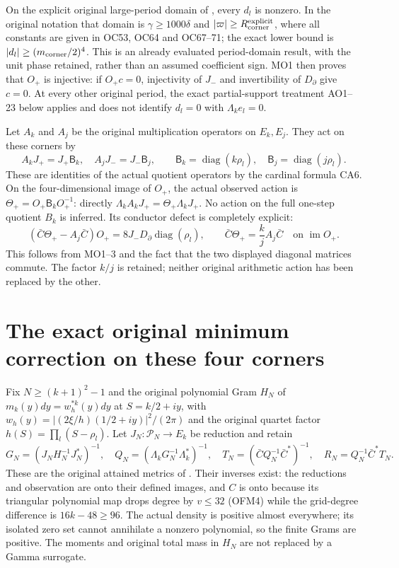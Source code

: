 \documentclass[11pt]{article}
\newcommand{\diag}{\operatorname{diag}}
\begin{document}
On the explicit original large-period domain of
\cite[OC50--74]{CornerNonzero}, every $d_l$ is nonzero. In the
original notation that domain is $\gamma\ge1000\delta$ and
$|\varpi|\ge R_{\rm corner}^{\rm explicit}$, where all constants
are given in OC53, OC64 and OC67--71; the exact lower bound is
$|d_l|\ge(m_{\rm corner}/2)^4$. This is an already evaluated
period-domain result, with the unit phase retained, rather than
an assumed coefficient sign. MO1 then proves that $O_+$ is
injective: if $O_+c=0$, injectivity of $J_-$ and invertibility
of $D_\partial$ give $c=0$. At every other original period,
the exact partial-support treatment AO1--23 below applies and
does not identify $d_l=0$ with $\Lambda_ke_l=0$.

Let $A_k$ and $A_j$ be the original multiplication operators
on $E_k,E_j$. They act on these corners by
\[
 A_kJ_+=J_+ \mathsf B_k,\quad A_jJ_-=J_-\mathsf B_j,\qquad
 \mathsf B_k=\diag(k\rho_l),\quad \mathsf B_j=\diag(j\rho_l).
 \tag{MO3}
\]
These are identities of the actual quotient operators by the
cardinal formula CA6. On the four-dimensional image of $O_+$,
the actual observed action is
$\Theta_+=O_+\mathsf B_kO_+^{-1}$: directly
$\Lambda_kA_kJ_+=\Theta_+\Lambda_kJ_+$.
No action on the full one-step quotient $B_k$ is inferred.
Its conductor defect is completely explicit:
\[
 (\bar C\Theta_+-A_j\bar C)O_+
       =8J_-D_\partial\diag(\rho_l),\qquad
 \bar C\Theta_+=\frac{k}{j}A_j\bar C
                 \quad\text{on }\operatorname{im}O_+.
 \tag{MO4}
\]
This follows from MO1--3 and the fact that the two displayed
diagonal matrices commute. The factor $k/j$ is retained;
neither original arithmetic action has been replaced by the other.

\section{The exact original minimum correction on these four corners}
Fix $N\ge(k+1)^2-1$ and the original polynomial Gram $H_N$
of $m_k(y)dy=w_h^{*k}(y)dy$ at $S=k/2+iy$, with
$w_h(y)=|(2\xi/h)(1/2+iy)|^2/(2\pi)$ and the original
quartet factor $h(S)=\prod_l(S-\rho_l)$.
Let $J_N:\mathcal P_N\to E_k$ be reduction and retain
\[
 G_N=(J_NH_N^{-1}J_N^*)^{-1},\quad
 Q_N=(\Lambda_kG_N^{-1}\Lambda_k^*)^{-1},\quad
 T_N=(\bar C Q_N^{-1}\bar C^*)^{-1},\quad
 R_N=Q_N^{-1}\bar C^*T_N. \tag{MO5}
\]
These are the original attained metrics of \cite[EQ1--5]{EightMinimum}.
Their inverses exist: the reductions and observation are onto their
defined images, and $C$ is onto because its triangular polynomial
map drops degree by $v\le32$ (OFM4) while the grid-degree difference is
$16k-48\ge96$. The actual density is positive almost everywhere;
its isolated zero set cannot annihilate a nonzero polynomial, so
the finite Grams are positive. The moments and original total mass
in $H_N$ are not replaced by a Gamma surrogate.
\end{document}
